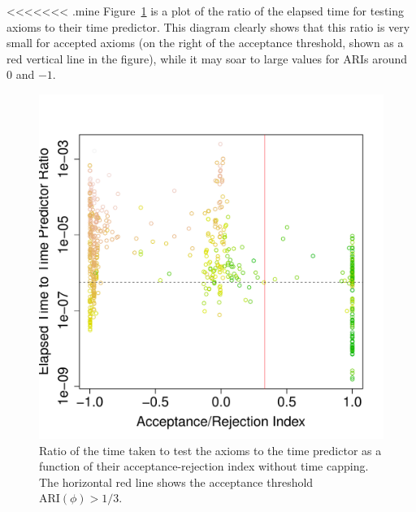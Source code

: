 \documentclass{sig-alternate}
\begin{document}


<<<<<<< .mine
Figure~\ref{fig:ratio-ARI} is a plot of the ratio of the elapsed time for testing axioms
to their time predictor. This diagram clearly shows that this ratio is very small for
accepted axioms (on the right of the acceptance threshold, shown as a red vertical line in the figure),
while it may soar to large values for ARIs around 0 and $-1$.

\begin{figure}[t]
\begin{center}
  \includegraphics[height=\plotheight]{ratio-ARI}
\end{center}
\caption{Ratio of the time taken to test the axioms to the time predictor
  as a function of their acceptance-rejection index without time capping.
  The horizontal red line shows the acceptance threshold $\mathrm{ARI}(\phi)>1/3$.}
\label{fig:ratio-ARI}
\end{figure}
\end{document}
